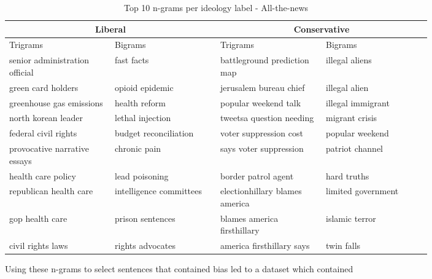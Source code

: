 \documentclass[10pt,a4paper,onecolumn]{article}
\begin{document}
\begin{table}[h!]
	\begin{center}
		\caption{Top 10 n-grams per ideology label - All-the-news}
		\label{tab:bigrams-atn}
		\begin{tabular}{p{0.2\linewidth}|p{0.2\linewidth}|p{0.2\linewidth}|p{0.2\linewidth}}
			\hline\hline
			\multicolumn{2}{c|}{\textbf{Liberal}} & \multicolumn{2}{c|}{\textbf{Conservative}} \\
			\hline
			Trigrams & Bigrams & Trigrams & Bigrams \\
			\hline
			senior administration official & fast facts & battleground prediction map & illegal aliens \\
			green card holders & opioid epidemic & jerusalem bureau chief & illegal alien \\
			greenhouse gas emissions & health reform & popular weekend talk & illegal immigrant \\
			north korean leader & lethal injection & tweetsa question needing & migrant crisis \\
			federal civil rights & budget reconciliation & voter suppression cost & popular weekend \\
			provocative narrative essays & chronic pain & says voter suppression & patriot channel \\
			health care policy & lead poisoning & border patrol agent & hard truths \\
			republican health care & intelligence committees & electionhillary blames america & limited government \\
			gop health care & prison sentences & blames america firsthillary & islamic terror \\
			civil rights laws & rights advocates & america firsthillary says & twin falls \\
			\hline\hline
		\end{tabular}
	\end{center}
\end{table}

Using these n-grams to select sentences that contained bias led to a dataset which contained 
\end{document}
